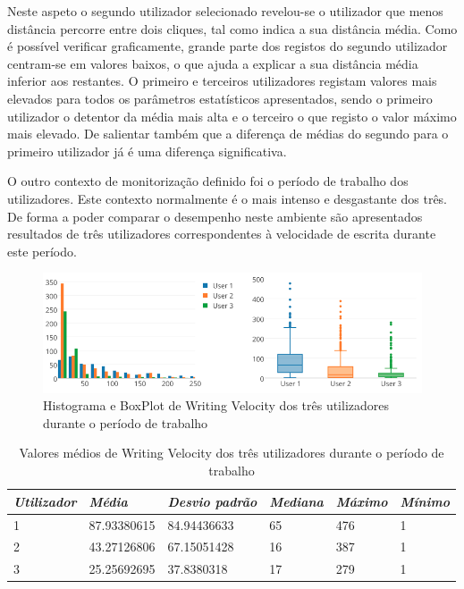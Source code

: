 Neste aspeto o segundo utilizador selecionado revelou-se o utilizador que menos distância percorre entre dois cliques, tal como indica a sua distância média. Como é possível verificar graficamente, grande parte dos registos do segundo utilizador centram-se em valores baixos, o que ajuda a explicar a sua distância média inferior aos restantes. O primeiro e terceiros utilizadores registam valores mais elevados para todos os parâmetros estatísticos apresentados, sendo o primeiro utilizador o detentor da média mais alta e o terceiro o que registo o valor máximo mais elevado. De salientar também que a diferença de médias do segundo para o primeiro utilizador já é uma diferença significativa.




O outro contexto de monitorização definido foi o período de trabalho dos utilizadores. Este contexto normalmente é o mais intenso e desgastante dos três. De forma a poder comparar o desempenho neste ambiente são apresentados resultados de três utilizadores correspondentes à velocidade de escrita durante este período. 


 \begin{figure}[htb]
   \centering
   \includegraphics[scale=0.45]{Images/writingvelocitywork.png}
   \caption{Histograma e BoxPlot de Writing Velocity dos três utilizadores durante o período de trabalho}
\end{figure}

{\renewcommand{\arraystretch}{1.0}
\begin{table}[!htb]
\centering
\label{tab:a_tbk}
\vspace{2pt}
\begin{tabular}{ | l | l | l | l | l | l |  }
\hline
\textit{Utilizador}&\textit{Média}&\textit{Desvio padrão}&\textit{Mediana} & \textit{Máximo} & \textit{Mínimo}\\  
\hline
1&87.93380615&84.94436633&65&476&1 \\
2&43.27126806&67.15051428&16&387&1 \\
3&25.25692695&37.8380318&17&279&1 \\
\hline
\end{tabular}
\caption{Valores médios de Writing Velocity dos três utilizadores durante o período de trabalho} 
\end{table}}

